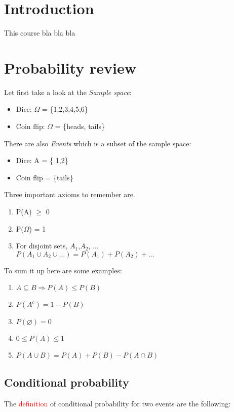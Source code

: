 

\section{Introduction}

This course bla bla bla

\section{Probability review}
Let first take a look at the \emph{Sample space}: 
\begin{itemize}
    \item Dice: $\Omega$ = \{1,2,3,4,5,6\}
    \item Coin flip: $\Omega$ = \{heads, tails\}
\end{itemize}
There are also \emph{Events} which is a subset of the sample space:
\begin{itemize}
    \item Dice: A = \{ 1,2\}
    \item Coin flip = \{tails\}
\end{itemize}
Three important axioms to remember are.
\begin{enumerate}
    \item P(A) $\ge$ 0
    \item P($\Omega$) = 1
    \item For disjoint sets, $A_1$,$A_2$, $\dots$ \\ $P(A_1 \cup A_2 \cup \dots) = P(A_1) + P(A_2) + \dots$         
\end{enumerate}

To sum it up here are some examples:

\begin{enumerate}
    \item $A \subseteq B \Rightarrow P(A) \le P(B)$
    \item $P(A^{c}) = 1 - P(B)$
    \item $P(\diameter)  = 0$
    \item $0 \le P(A) \le 1$
    \item $P(A \cup B)  = P(A) + P(B) - P(A\cap B)$
\end{enumerate}

\subsection{Conditional probability}
The \textcolor{red}{definition} of conditional probability for two events are the following:

